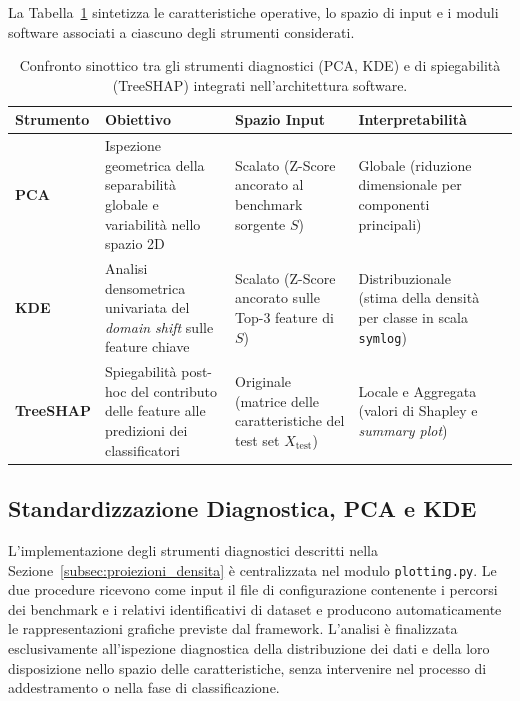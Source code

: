 La Tabella~\ref{tab:confronto_strumenti_diagnostici} sintetizza le caratteristiche operative, lo spazio di input e i moduli software associati a ciascuno degli strumenti considerati.

\begin{table}[H]
    \centering
    \small
    \caption{Confronto sinottico tra gli strumenti diagnostici (PCA, KDE) e di spiegabilità (TreeSHAP) integrati nell'architettura software.}
    \label{tab:confronto_strumenti_diagnostici}
    \begin{tabularx}{\textwidth}{l >{\raggedright\arraybackslash}X >{\raggedright\arraybackslash}X >{\raggedright\arraybackslash}X >{\raggedright\arraybackslash}X}
        \toprule
        \textbf{Strumento} & \textbf{Obiettivo} & \textbf{Spazio Input} & \textbf{Interpretabilità} \\
        \midrule
        \textbf{PCA} & Ispezione geometrica della separabilità globale e variabilità nello spazio 2D & Scalato (Z-Score ancorato al benchmark sorgente $S$) & Globale (riduzione dimensionale per componenti principali) \\
        \addlinespace
        \textbf{KDE} & Analisi densometrica univariata del \textit{domain shift} sulle feature chiave & Scalato (Z-Score ancorato sulle Top-3 feature di $S$) & Distribuzionale (stima della densità per classe in scala \texttt{symlog}) \\
        \addlinespace
        \textbf{TreeSHAP} & Spiegabilità post-hoc del contributo delle feature alle predizioni dei classificatori & Originale (matrice delle caratteristiche del test set $X_{\mathrm{test}}$) & Locale e Aggregata (valori di Shapley e \textit{summary plot}) \\
        \bottomrule
    \end{tabularx}
\end{table}


\subsection{Standardizzazione Diagnostica, PCA e KDE}
\label{subsec:implementazione_pca_kde}

L'implementazione degli strumenti diagnostici descritti nella Sezione~\ref{subsec:proiezioni_densita} è centralizzata nel modulo \texttt{plotting.py}. 
Le due procedure ricevono come input il file di configurazione contenente i percorsi dei benchmark e i relativi identificativi di dataset e producono automaticamente le rappresentazioni grafiche previste dal framework. 
L'analisi è finalizzata esclusivamente all'ispezione diagnostica della distribuzione dei dati e della loro disposizione nello spazio delle caratteristiche, senza intervenire nel processo di addestramento o nella fase di classificazione.

